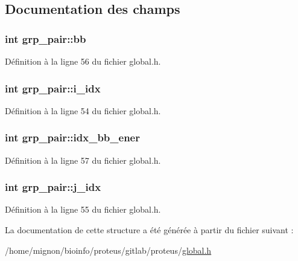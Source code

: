 \subsection{Documentation des champs}
\hypertarget{structgrp__pair_a505e8d72d6acb9b36552b8431e1b01f8}{
\subsubsection[{bb}]{\setlength{\rightskip}{0pt plus 5cm}int grp\+\_\+pair\+::bb}}\label{structgrp__pair_a505e8d72d6acb9b36552b8431e1b01f8}


Définition à la ligne 56 du fichier global.\+h.

\hypertarget{structgrp__pair_ab388fed1b507336da2f0b68be33ce801}{
\subsubsection[{i\+\_\+idx}]{\setlength{\rightskip}{0pt plus 5cm}int grp\+\_\+pair\+::i\+\_\+idx}}\label{structgrp__pair_ab388fed1b507336da2f0b68be33ce801}


Définition à la ligne 54 du fichier global.\+h.

\hypertarget{structgrp__pair_a3fb4ca165efc17241f2e3d4f51dd2add}{
\subsubsection[{idx\+\_\+bb\+\_\+ener}]{\setlength{\rightskip}{0pt plus 5cm}int grp\+\_\+pair\+::idx\+\_\+bb\+\_\+ener}}\label{structgrp__pair_a3fb4ca165efc17241f2e3d4f51dd2add}


Définition à la ligne 57 du fichier global.\+h.

\hypertarget{structgrp__pair_a5e1eb3ec5fbf8cbad20864b3065eca4f}{
\subsubsection[{j\+\_\+idx}]{\setlength{\rightskip}{0pt plus 5cm}int grp\+\_\+pair\+::j\+\_\+idx}}\label{structgrp__pair_a5e1eb3ec5fbf8cbad20864b3065eca4f}


Définition à la ligne 55 du fichier global.\+h.



La documentation de cette structure a été générée à partir du fichier suivant \+:\begin{DoxyCompactItemize}
\item 
/home/mignon/bioinfo/proteus/gitlab/proteus/\hyperlink{global_8h}{global.\+h}\end{DoxyCompactItemize}

